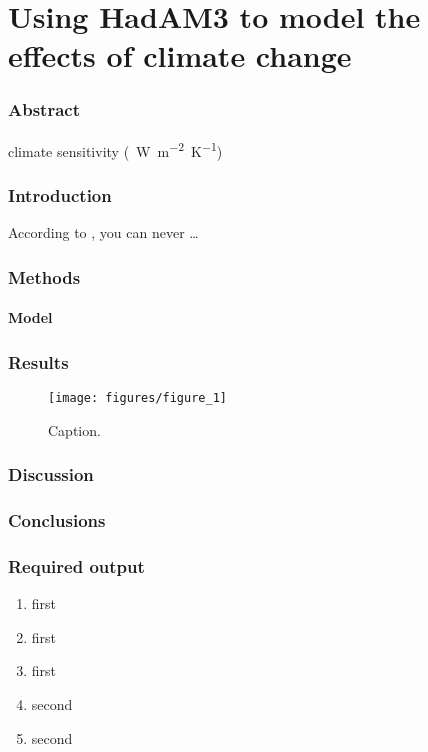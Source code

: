\documentclass{article}
\begin{document}
\part*{Using HadAM3 to model the effects of climate change}

\section*{Abstract}

 climate sensitivity (\SI{}{W.m^{-2}.K^{-1}})

\section{Introduction}

According to \textcite{gregory2004new}, you can never \dots

\section{Methods}

\subsection{Model}

\section{Results}

\begin{figure}[hbp]
    \centering
    \texttt{[image: figures/figure\_1]}
    \caption{Caption.}
    \label{fig:figure_1}
\end{figure}

\section{Discussion}

\section{Conclusions}

\printbibliography
\appendix 

\section{Required output}

\begin{enumerate}
    \item first
    \item first
    \item first
    \item second
    \item second
\end{enumerate}
\end{document}
